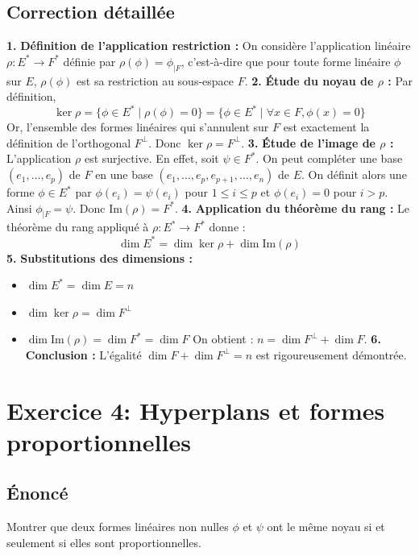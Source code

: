 \documentclass[12pt,a4paper]{report}
\begin{document}
\section{Correction détaillée}
\textbf{1.} \textbf{Définition de l'application restriction :} On considère l'application linéaire $\rho : E^* \to F^*$ définie par $\rho(\phi) = \phi_{|F}$, c'est-à-dire que pour toute forme linéaire $\phi$ sur $E$, $\rho(\phi)$ est sa restriction au sous-espace $F$.
\textbf{2.} \textbf{Étude du noyau de $\rho$ :} Par définition,
   $$\ker \rho = \{ \phi \in E^* \mid \rho(\phi) = 0 \} = \{ \phi \in E^* \mid \forall x \in F, \phi(x) = 0 \}$$
   Or, l'ensemble des formes linéaires qui s'annulent sur $F$ est exactement la définition de l'orthogonal $F^\perp$. Donc $\ker \rho = F^\perp$.
\textbf{3.} \textbf{Étude de l'image de $\rho$ :} L'application $\rho$ est surjective. En effet, soit $\psi \in F^*$. On peut compléter une base $(e_1, \dots, e_p)$ de $F$ en une base $(e_1, \dots, e_p, e_{p+1}, \dots, e_n)$ de $E$. On définit alors une forme $\phi \in E^*$ par $\phi(e_i) = \psi(e_i)$ pour $1 \le i \le p$ et $\phi(e_i) = 0$ pour $i > p$. Ainsi $\phi_{|F} = \psi$.
   Donc $\text{Im}(\rho) = F^*$.
\textbf{4.} \textbf{Application du théorème du rang :} Le théorème du rang appliqué à $\rho : E^* \to F^*$ donne :
   $$\dim E^* = \dim \ker \rho + \dim \text{Im}(\rho)$$
\textbf{5.} \textbf{Substitutions des dimensions :}
\begin{itemize}
\item $\dim E^* = \dim E = n$
\item $\dim \ker \rho = \dim F^\perp$
\item $\dim \text{Im}(\rho) = \dim F^* = \dim F$
   On obtient : $n = \dim F^\perp + \dim F$.
\textbf{6.} \textbf{Conclusion :} L'égalité $\dim F + \dim F^\perp = n$ est rigoureusement démontrée.
\end{itemize}

\newpage
\chapter{Exercice 4: Hyperplans et formes proportionnelles}
\section{Énoncé}
Montrer que deux formes linéaires non nulles $\phi$ et $\psi$ ont le même noyau si et seulement si elles sont proportionnelles.
\end{document}
